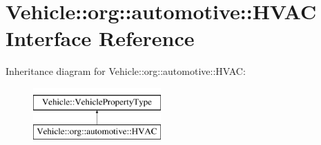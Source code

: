 \hypertarget{interfaceVehicle_1_1org_1_1automotive_1_1HVAC}{\section{Vehicle\-:\-:org\-:\-:automotive\-:\-:H\-V\-A\-C Interface Reference}
\label{interfaceVehicle_1_1org_1_1automotive_1_1HVAC}
}
Inheritance diagram for Vehicle\-:\-:org\-:\-:automotive\-:\-:H\-V\-A\-C\-:\begin{figure}[H]
\begin{center}
\leavevmode
\includegraphics[height=2.000000cm]{interfaceVehicle_1_1org_1_1automotive_1_1HVAC}
\end{center}
\end{figure}
